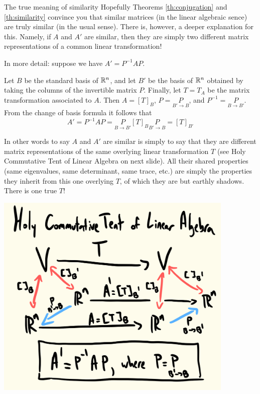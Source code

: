 \begin{frame}{The true meaning of similarity}
Hopefully Theorems \ref{th:conjugation} and \ref{th:similarity} convince you that similar matrices (in the linear algebraic sence) are truly similar (in the usual sense). 
\bpause
There is, however, a deeper explanation for this. Namely, if $A$ and $A'$ are similar, then they are simply two different matrix representations of a common linear transformation!
\pause

In more detail: suppose we have $A'=P^{-1}AP$. 
\begin{itemize}
\ii Let $B$ be the standard basis of ${\mathbb R}^n$, and let $B'$ be the basis of ${\mathbb R}^n$ obtained by taking the columns of the invertible matrix $P$. Finally, let $T=T_A$ be the matrix transformation associated to $A$. 
\ii Then $A=[T]_B$, $P=\underset{B'\rightarrow B}{P}$, and $P^{-1}=\underset{B\rightarrow B'}{P}$. 
\ii From the change of basis formula it follows that 
\[
A'=P^{-1}AP=\underset{B\rightarrow B'}{P}[T]_B\underset{B'\rightarrow B}{P}=[T]_{B'}
\]
\end{itemize}
\bpause
In other words to say $A$ and $A'$ are similar is simply to say that they are different matrix representations of the same overlying linear transformation $T$ (see Holy Commutative Tent of Linear Algebra on next slide). All their shared properties (same eigenvalues, same determinant, same trace, etc.) are simply the properties they inherit from this one overlying $T$, of which they are but earthly shadows. 
\bpause
There is one true $T$!
\end{frame}
\begin{frame}
\includegraphics[width=4.5in]{Images/HolyCommutativeTent}

\end{frame}

